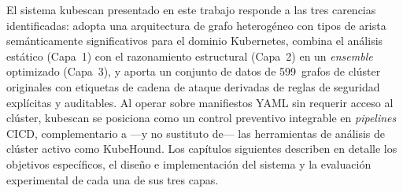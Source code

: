 El sistema kubescan presentado en este trabajo responde a las tres carencias
identificadas: adopta una arquitectura de grafo heterogéneo con tipos de arista
semánticamente significativos para el dominio Kubernetes, combina el análisis
estático (Capa~1) con el razonamiento estructural (Capa~2) en un \textit{ensemble}
optimizado (Capa~3), y aporta un conjunto de datos de 599~grafos de clúster
originales con etiquetas de cadena de ataque derivadas de reglas de seguridad
explícitas y auditables. Al operar sobre manifiestos \acs{YAML} sin requerir acceso
al clúster, kubescan se posiciona como un control preventivo integrable en
\textit{pipelines} \acs{CICD}, complementario a —y no sustituto de— las herramientas de
análisis de clúster activo como KubeHound. Los capítulos siguientes describen en
detalle los objetivos específicos, el diseño e implementación del sistema y la
evaluación experimental de cada una de sus tres capas.

